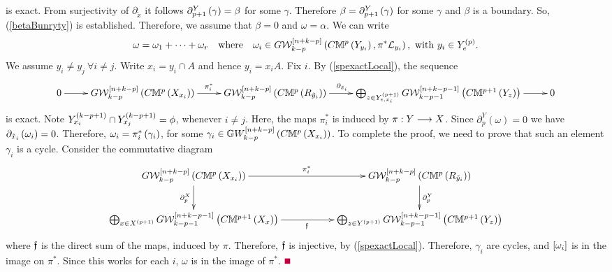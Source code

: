 \documentclass[12pt]{article}
\begin{document}
is exact.  %
From surjectivity of $\partial_{\tilde{x}}$ it follows $\partial_{p+1}^Y\left( \gamma\right) =\beta$ for some $\gamma$. Therefore $\beta= \partial_{p+1}^Y\left( \gamma\right)$ for some $\gamma$ and $\beta$ is a boundary. So, (\ref{betaBunryty}) is established. 
%
Therefore, we  assume that $\beta=0$ and $\omega=\alpha$.
%
We can write 
$$
\omega= \omega_1 + \cdots + \omega_r\quad {\rm where}  \quad \omega_i\in G{\mathcal{W}}^{\left[ n+k-p\right]}_{k-p}\left( C{\mathbb{M}}^{p}\left( Y_{y_i}\right), 
\pi^*{\mathcal{L}}_{y_i}\right), ~{\rm with} ~y_i\in Y_e^{\left( p\right)}. 
$$
We assume $y_i\neq y_j~\forall i\neq j$. 
Write $x_i=y_i\cap A$ and hence $y_i=x_iA$. Fix $i$. By 
 (\ref{spexactLocal}), the sequence 
{
$$
\diagram 
0 \ar[r] & {G}{\CW}^{\LRt{n+k-p}}_{k-p}\LRf{C{\BM}^{p}\LRf{X_{x_i}}}
\ar[r]^{\pi_i^*} & {G}{\CW}_{k-p}^{\LRt{n+k-p}}\LRf{C{\BM}^{p}\LRf{R_{\tilde{y}_i}}}
\ar[r]^{\partial_{\tilde{x}_i}\qquad\quad } & \bigoplus _{z\in Y^{\LRf{p+1}}_{e, x_i}}{G}{\CW}_{k-p-1}^{\LRt{n+k-p-1}}\LRf{C{\BM}^{p+1}\LRf{Y_z}}\ar[r] & 0\\
\enddiagram
$$
}
is exact. %
Note $Y^{\left( k-p+1\right)}_{x_i}\cap Y^{\left( k-p+1\right)}_{x_j}=\phi$, whenever $i\neq j$.
Here, the maps $\pi_i^*$ is induced by $\pi: Y \longrightarrow X$.
Since $\partial^Y_p(\omega)=0$ we have $\partial_{\tilde{x}_i}\left( \omega_i\right)=0$. 
Therefore, $\omega_i= \pi^*_i\left( \gamma_i\right)$, for some $\gamma_i\in {\mathbb{G}}W^{\left[ n+k-p\right]}_{k-p}\left( C{\mathbb{M}}^{p}\left( X_{x_i}\right)\right)$. 
To complete the proof, we need to prove that such an element $\gamma_i$ is a cycle. Consider the commutative diagram 
\begin{equation}\label{preuveSur}
\diagram 
{G}{\CW}^{\LRt{n+k-p}}_{k-p}\LRf{C{\BM}^{p}\LRf{X_{x_i}}}\ar[d]_{\partial^X_p}
\ar[rr]^{\pi_i^*} && {G}{\CW}_{k-p}^{\LRt{n+k-p}}\LRf{C{\BM}^{p}\LRf{R_{\tilde{y}_i}}}
\ar[d]^{\partial_p^Y } \\
% 
 \bigoplus _{x\in X^{\LRf{p+1}}} {G}{\CW}_{k-p-1}^{\LRt{n+k-p-1}}\LRf{C{\BM}^{p+1}\LRf{X_x}}\ar[rr]_{\f}&&
 \bigoplus _{z\in Y^{\LRf{p+1}}}{G}{\CW}_{k-p-1}^{\LRt{n+k-p-1}}\LRf{C{\BM}^{p+1}\LRf{Y_z}}\\ %
\enddiagram 
\end{equation}
where $\mathfrak {f}$ is the direct sum of the maps, induced by $\pi$.
Therefore, $\mathfrak {f}$ is injective, by (\ref{spexactLocal}). Therefore, $\gamma_i$ are cycles, and $\left[ \omega_i\right]$ is in the
image on $\pi^*$.  
Since this works for each $i$, $\omega$ is in the image of $\pi^*$. 
%
\pic $\eop$ 
\end{document}
